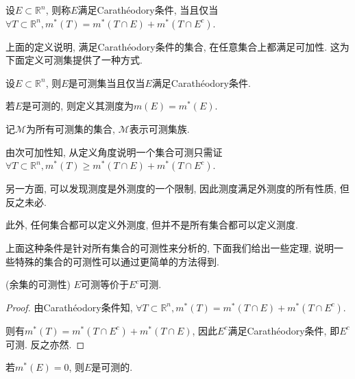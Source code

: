 \documentclass[theorem=false,mathfont=none,openany,sub3section]{easybook}
\begin{document}
\begin{definition}
  设$E\subset \mathbb{R}^n$, 则称$E$满足Carathéodory条件, 当且仅当$\forall T\subset \mathbb{R}^n, m^{*}(T)=m^{*}(T\cap E)+m^{*}(T\cap E^c)$.\par 
\end{definition}

\begin{remark}
  上面的定义说明, 满足Carathéodory条件的集合, 在任意集合上都满足可加性. 这为下面定义可测集提供了一种方式.\par
\end{remark}

\begin{definition}
  设$E\subset \mathbb{R}^n$, 则$E$是可测集当且仅当$E$满足Carathéodory条件.\par
  若$E$是可测的, 则定义其测度为$m(E)=m^{*}(E)$.\par
  记$\mathcal{M}$为所有可测集的集合, $\mathcal{M}$表示可测集族.\par
\end{definition}

\begin{remark}
  由次可加性知, 从定义角度说明一个集合可测只需证$\forall T\subset \mathbb{R}^n, m^{*}(T)\geqslant m^{*}(T\cap E)+m^{*}(T\cap E^c)$.\par
  另一方面, 可以发现测度是外测度的一个限制, 因此测度满足外测度的所有性质, 但反之未必.\par
  此外, 任何集合都可以定义外测度, 但并不是所有集合都可以定义测度.\par
\end{remark}

上面这种条件是针对所有集合的可测性来分析的, 下面我们给出一些定理, 说明一些特殊的集合的可测性可以通过更简单的方法得到.\par

\begin{theorem}
  (余集的可测性) $E$可测等价于$E^c$可测.\par
\end{theorem}

\begin{proof}
  由Carathéodory条件知, $\forall T\subset \mathbb{R}^n, m^{*}(T)=m^{*}(T\cap E)+m^{*}(T\cap E^c)$.\par
  则有$m^{*}(T)=m^{*}(T\cap E^c)+m^{*}(T\cap E)$, 因此$E^c$满足Carathéodory条件, 即$E^c$可测. 反之亦然.\par
\end{proof}

\begin{theorem}
  若$m^{*}(E)=0$, 则$E$是可测的.\par
\end{theorem}
\end{document}
